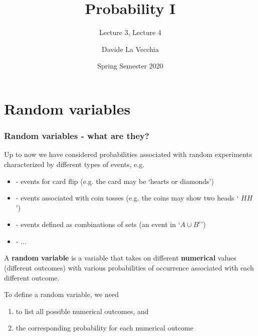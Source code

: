 \documentclass[notes=show,smaller,handout]{beamer}
\newenvironment{stepenumerate}{\begin{enumerate}[<+->]}{\end{enumerate}}
\newenvironment{stepitemize}{\begin{itemize}[<+->]}{\end{itemize} }
\begin{document}
\title[S110015]{Probability I}
\subtitle{Lecture 3, Lecture 4}
\author[La Vecchia]{Davide La Vecchia}
\date{Spring Semester 2020}
\maketitle



\section{Random variables}

\begin{frame}

\frametitle{Random variables - what are they?}

Up to now we have considered probabilities associated with random
experiments characterized by different types of events, e.g.

\vspace{0.4cm}

\begin{stepitemize}
\item[-] events for card flip (e.g. the card may be `hearts or diamonds')

\item[-] events associated with coin tosses (e.g. the coins may show two heads `%
$HH$')

\item[-] events defined as combinations of sets (an event in `$A\cup B^{c}$')
\item[-]...
\end{stepitemize}

\begin{definition}

A \textbf{random variable} is a variable that takes on different 
\textbf{numerical} values (different outcomes) with various probabilities of
occurrence associated with each different outcome. \\
\vspace{0.4cm}
\end{definition}

To define a random variable, we need

\begin{stepenumerate}
\item to list all possible numerical outcomes, and

\item the corresponding probability for each numerical outcome
\end{stepenumerate}


\end{frame}%
\end{document}
